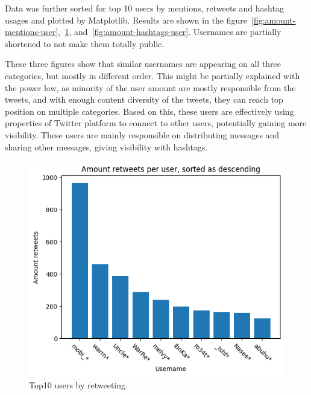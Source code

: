 \documentclass[conference]{IEEEtran}
\begin{document}
    Data was further sorted for top 10 users by mentions, retweets and hashtag usages and plotted by Matplotlib.
    Results are shown in the figure~\ref{fig:amount-mentions-user},~\ref{fig:amount-retweets-user}, and~\ref{fig:amount-hashtags-user}.
    Usernames are partially shortened to not make them totally public.

    These three figures show that similar usernames are appearing on all three categories, but mostly in different order.
    This might be partially explained with the power law, as minority of the user amount are mostly responsible from the tweets,
    and with enough content diversity of the tweets, they can reach top position on multiple categories.
    Based on this, these users are effectively using properties of Twitter platform to connect to other users, potentially gaining more visibility.
    These users are mainly responsible on distributing messages and sharing other messages, giving visibility with hashtags.


    \begin{figure}
        \includegraphics[scale=0.6]{figures/amount_retweets_user}
        \caption{Top10 users by retweeting.}
        \label{fig:amount-retweets-user}
    \end{figure}
\end{document}
